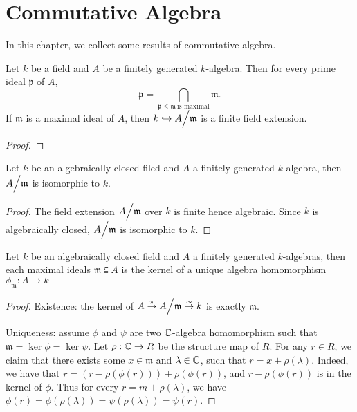 \chapter{Commutative Algebra}

In this chapter, we collect some results of commutative algebra.

\begin{theorem}
  \label{thm:hilbert-nullstellensatz-finite-field-extension}
  Let $k$ be a field and $A$ be a finitely generated $k$-algebra. Then for every prime ideal $\mathfrak{p}$ of $A$,
  \[
    \mathfrak p = \bigcap_{\mathfrak{p} \le \mathfrak{m}~ \text{is maximal}} \mathfrak{m}.
  \]
  If $\mathfrak m$ is a maximal ideal of $A$, then $k \hookrightarrow {A}\Big/{\mathfrak m}$ is a finite field extension.
\end{theorem}
\begin{proof}
\end{proof}

\begin{corollary}
Let $k$ be an algebraically closed filed and $A$ a finitely generated $k$-algebra, then ${A}\Big/{\mathfrak m}$ is isomorphic to $k$.
\end{corollary}
\begin{proof}
The field extension ${A}\Big/{\mathfrak m}$ over $k$ is finite hence algebraic. Since $k$ is algebraically closed, ${A}\Big/{\mathfrak m}$ is isomorphic to $k$.
\end{proof}

\begin{corollary}\label{cor:maximal-ideal-algebra-hom}
Let $k$ be an algebraically closed field and $A$ a finitely generated $k$-algebras, then each maximal ideals $\mathfrak m \subseteqq A$ is the kernel of a unique algebra homomorphism $\phi_{\mathfrak m} : A \to k$
\end{corollary}

\begin{proof}


  Existence: the kernel of $A \stackrel{\pi}{\to} {A}\Big/{\mathfrak m} \stackrel{\sim}{\to} k$ is exactly $\mathfrak m$.

  Uniqueness: assume $\phi$ and $\psi$ are two $\mathbb{C}$-algebra homomorphism such that $\mathfrak{m}=\ker \phi = \ker \psi$.
  Let $\rho : \mathbb{C} \to R$ be the structure map of $R$.
  For any $r \in R$, we claim that there exists some $x \in \mathfrak m$ and $\lambda \in \mathbb{C}$, such that $r = x + \rho(\lambda)$. Indeed, we have that $r = (r - \rho(\phi(r))) + \rho(\phi(r))$, and $r - \rho(\phi(r))$ is in the kernel of $\phi$. Thus for every $r = m + \rho(\lambda)$, we have $\phi(r) = \phi(\rho(\lambda)) = \psi(\rho(\lambda)) = \psi(r)$.
\end{proof}
